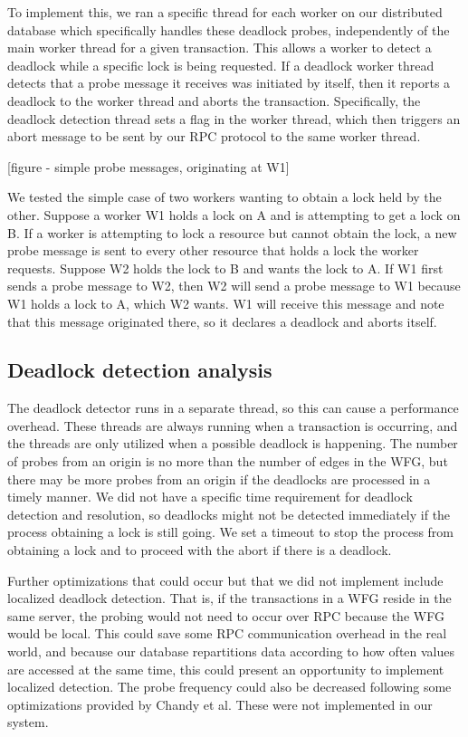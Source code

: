 \documentclass[a4paper, 10pt, notitlepage]{report}
\begin{document}
To implement this, we ran a specific thread for each worker on our distributed database which specifically handles these deadlock probes, independently of the main worker thread for a given transaction. This allows a worker to detect a deadlock while a specific lock is being requested. If a deadlock worker thread detects that a probe message it receives was initiated by itself, then it reports a deadlock to the worker thread and aborts the transaction. Specifically, the deadlock detection thread sets a flag in the worker thread, which then triggers an abort message to be sent by our RPC protocol to the same worker thread.

[figure - simple probe messages, originating at W1]

We tested the simple case of two workers wanting to obtain a lock held by the other. Suppose a worker W1 holds a lock on A and is attempting to get a lock on B. If a worker is attempting to lock a resource but cannot obtain the lock, a new probe message is sent to every other resource that holds a lock the worker requests. Suppose W2 holds the lock to B and wants the lock to A. If W1 first sends a probe message to W2, then W2 will send a probe message to W1 because W1 holds a lock to A, which W2 wants. W1 will receive this message and note that this message originated there, so it declares a deadlock and aborts itself.

\subsection*{Deadlock detection analysis}
The deadlock detector runs in a separate thread, so this can cause a performance overhead. These threads are always running when a transaction is occurring, and the threads are only utilized when a possible deadlock is happening. The number of probes from an origin is no more than the number of edges in the WFG, but there may be more probes from an origin if the deadlocks are processed in a timely manner. We did not have a specific time requirement for deadlock detection and resolution, so deadlocks might not be detected immediately if the process obtaining a lock is still going. We set a timeout to stop the process from obtaining a lock and to proceed with the abort if there is a deadlock.

Further optimizations that could occur but that we did not implement include localized deadlock detection. That is, if the transactions in a WFG reside in the same server, the probing would not need to occur over RPC because the WFG would be local. This could save some RPC communication overhead in the real world, and because our database repartitions data according to how often values are accessed at the same time, this could present an opportunity to implement localized detection. The probe frequency could also be decreased following some optimizations provided by Chandy et al. These were not implemented in our system.
\end{document}

